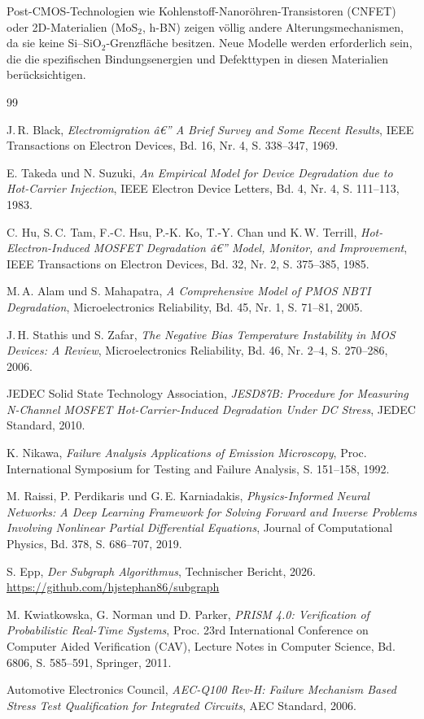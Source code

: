 ﻿\documentclass[a4paper,12pt]{article}
\theoremstyle{definition}
\begin{document}
Post-CMOS-Technologien wie Kohlenstoff-Nanoröhren-Transistoren (CNFET) oder
2D-Materialien (MoS$_2$, h-BN) zeigen völlig andere Alterungsmechanismen,
da sie keine Si--SiO$_2$-Grenzfläche besitzen. Neue Modelle werden erforderlich
sein, die die spezifischen Bindungsenergien und Defekttypen in diesen Materialien
berücksichtigen.

\begin{thebibliography}{99}

J.\,R. Black,
\emph{Electromigration â€” A Brief Survey and Some Recent Results},
IEEE Transactions on Electron Devices, Bd. 16, Nr. 4, S. 338--347, 1969.

E. Takeda und N. Suzuki,
\emph{An Empirical Model for Device Degradation due to Hot-Carrier Injection},
IEEE Electron Device Letters, Bd. 4, Nr. 4, S. 111--113, 1983.

C. Hu, S.\,C. Tam, F.-C. Hsu, P.-K. Ko, T.-Y. Chan und K.\,W. Terrill,
\emph{Hot-Electron-Induced MOSFET Degradation â€” Model, Monitor, and Improvement},
IEEE Transactions on Electron Devices, Bd. 32, Nr. 2, S. 375--385, 1985.

M.\,A. Alam und S. Mahapatra,
\emph{A Comprehensive Model of PMOS NBTI Degradation},
Microelectronics Reliability, Bd. 45, Nr. 1, S. 71--81, 2005.

J.\,H. Stathis und S. Zafar,
\emph{The Negative Bias Temperature Instability in MOS Devices: A Review},
Microelectronics Reliability, Bd. 46, Nr. 2--4, S. 270--286, 2006.

JEDEC Solid State Technology Association,
\emph{JESD87B: Procedure for Measuring N-Channel MOSFET Hot-Carrier-Induced
Degradation Under DC Stress},
JEDEC Standard, 2010.

K. Nikawa,
\emph{Failure Analysis Applications of Emission Microscopy},
Proc. International Symposium for Testing and Failure Analysis, S. 151--158, 1992.

M. Raissi, P. Perdikaris und G.\,E. Karniadakis,
\emph{Physics-Informed Neural Networks: A Deep Learning Framework for Solving
Forward and Inverse Problems Involving Nonlinear Partial Differential Equations},
Journal of Computational Physics, Bd. 378, S. 686--707, 2019.

S. Epp,
\emph{Der Subgraph Algorithmus},
Technischer Bericht, 2026.
\url{https://github.com/hjstephan86/subgraph}

M. Kwiatkowska, G. Norman und D. Parker,
\emph{PRISM 4.0: Verification of Probabilistic Real-Time Systems},
Proc. 23rd International Conference on Computer Aided Verification (CAV),
Lecture Notes in Computer Science, Bd. 6806, S. 585--591, Springer, 2011.

Automotive Electronics Council,
\emph{AEC-Q100 Rev-H: Failure Mechanism Based Stress Test Qualification
for Integrated Circuits},
AEC Standard, 2006.

\end{thebibliography}
\end{document}
